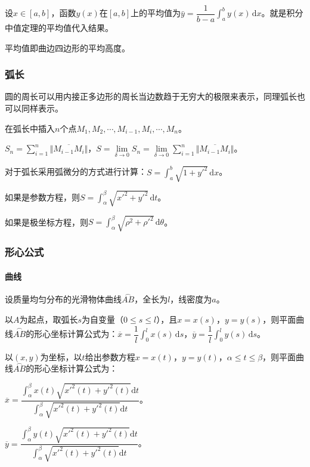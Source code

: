 \documentclass[UTF8, 12pt]{ctexart}
\begin{document}
设$x\in[a,b]$，函数$y(x)$在$[a,b]$上的平均值为$\bar{y}=\dfrac{1}{b-a}\int_a^by(x)\,\textrm{d}x$。就是积分中值定理的平均值代入结果。

平均值即曲边四边形的平均高度。

\subsubsection{弧长}

圆的周长可以用内接正多边形的周长当边数趋于无穷大的极限来表示，同理弧长也可以同样表示。

在弧长中插入$n$个点$M_1,M_2,\cdots,M_{i-1},M_i,\cdots,M_n$。

$S_n=\sum\limits_{i=1}^n\Vert\overline{M_{i-1}M_{i}}\Vert$，$S=\lim\limits_{\delta\to 0}S_n=\lim\limits_{\delta\to 0}\sum\limits_{i=1}^n\Vert\overline{M_{i-1}M_{i}}\Vert$。

对于弧长采用弧微分的方式进行计算：$S=\int_a^b\sqrt{1+y'^2}\,\textrm{d}x$。

如果是参数方程，则$S=\int_\alpha^\beta\sqrt{x'^2+y'^2}\,\textrm{d}t$。

如果是极坐标方程，则$S=\int_\alpha^\beta\sqrt{\rho^2+\rho'^2}\,\textrm{d}\theta$。

\subsubsection{形心公式}

\paragraph{曲线} \leavevmode \medskip

设质量均匀分布的光滑物体曲线$\overset{\frown}{AB}$，全长为$l$，线密度为$a$。

以$A$为起点，取弧长$s$为自变量（$0\leqslant s\leqslant l$），且$x=x(s)$，$y=y(s)$，则平面曲线$\overset{\frown}{AB}$的形心坐标计算公式为：$\overline{x}=\dfrac{1}{l}\int_0^lx(s)\,\textrm{d}s$，$\overline{y}=\dfrac{1}{l}\int_0^ly(s)\,\textrm{d}s$。

以$(x,y)$为坐标，以$t$给出参数方程$x=x(t)$，$y=y(t)$，$\alpha\leqslant t\leqslant\beta$，则平面曲线$\overset{\frown}{AB}$的形心坐标计算公式为：\medskip

$\overline{x}=\dfrac{\int_\alpha^\beta x(t)\sqrt{x'^2(t)+y'^2(t)}\textrm{d}t}{\int_\alpha^\beta\sqrt{x'^2(t)+y'^2(t)}\textrm{d}t}$。

$\overline{y}=\dfrac{\int_\alpha^\beta y(t)\sqrt{x'^2(t)+y'^2(t)}\textrm{d}t}{\int_\alpha^\beta\sqrt{x'^2(t)+y'^2(t)}\textrm{d}t}$。
\end{document}
